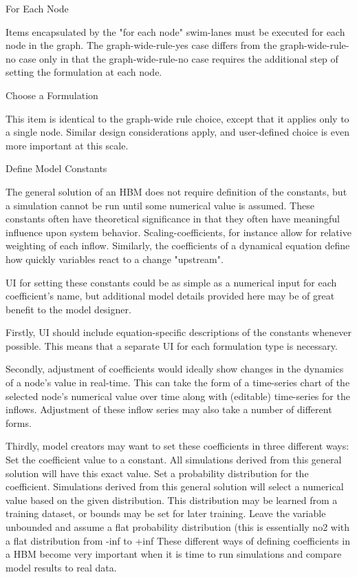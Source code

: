 For Each Node

Items encapsulated by the "for each node" swim-lanes must be executed for each node in the graph. The graph-wide-rule-yes case differs from the graph-wide-rule-no case only in that the graph-wide-rule-no case requires the additional step of setting the formulation at each node.

Choose a Formulation

This item is identical to the graph-wide rule choice, except that it applies only to a single node. Similar design considerations apply, and user-defined choice is even more important at this scale.

Define Model Constants

The general solution of an HBM does not require definition of the constants, but a simulation cannot be run until some numerical value is assumed. These constants often have theoretical significance in that they often have meaningful influence upon system behavior. Scaling-coefficients, for instance allow for relative weighting of each inflow. Similarly, the coefficients of a dynamical equation define how quickly variables react to a change "upstream". 

UI for setting these constants could be as simple as a numerical input for each coefficient's name, but additional model details provided here may be of great benefit to the model designer. 

Firstly, UI should include equation-specific descriptions of the constants whenever possible. This means that a separate UI for each formulation type is necessary. 

Secondly, adjustment of coefficients would ideally show changes in the dynamics of a node's value in real-time. This can take the form of a time-series chart of the selected node's numerical value over time along with (editable) time-series for the inflows. Adjustment of these inflow series may also take a number of different forms. 

Thirdly, model creators may want to set these coefficients in three different ways: 
Set the coefficient value to a constant. All simulations derived from this general solution will have this exact value.
Set a probability distribution for the coefficient. Simulations derived from this general solution will select a numerical value based on the given distribution. This distribution may be learned from a training dataset, or bounds may be set for later training. 
Leave the variable unbounded and assume a flat probability distribution (this is essentially no2 with a flat distribution from -inf to +inf
These different ways of defining coefficients in a HBM become very important when it is time to run simulations and compare model results to real data. 


